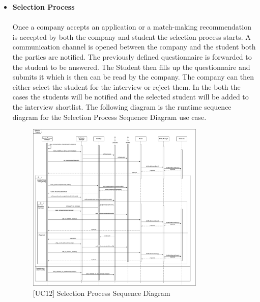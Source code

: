 \begin{itemize}
\begin{figure}[H]
    \end{figure}
    \item \textbf{Selection Process} \\ \\
    Once a company accepts an application or a match-making recommendation is accepted by both the company and student the selection process starts. A communication channel is opened between the company and the student both the parties are notified. The previously defined questionnaire is forwarded to the student to be answered. The Student then fills up the questionnaire and submits it which is then can be read by the company. The company can then either select the student for the interview or reject them. In the both the cases the students will be notified and the selected student will be added to the interview shortlist. The following diagram is the runtime sequence diagram for the Selection Process Sequence Diagram use case.
    \begin{figure}[H]
    \centering
    \includegraphics[width=0.8\textwidth]{Images/select_process_seq_diag.png}
    \caption{\label{fig:metamodel9}[UC12] Selection Process Sequence Diagram}
    \end{figure}
    

\end{itemize}
